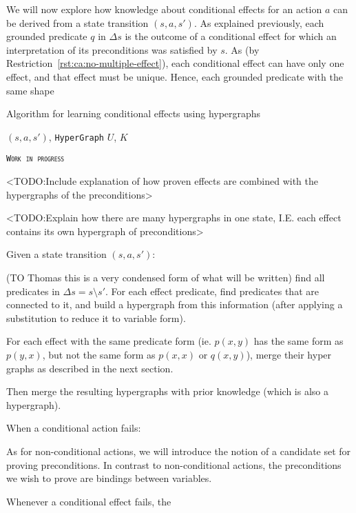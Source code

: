 \documentclass[../Master.tex]{subfiles}
\begin{document}
We will now explore how knowledge about conditional effects for an action $a$ can be derived from a  state transition $\left( s, a ,s' \right)$. As explained previously, each grounded predicate $q$ in $\Delta s$ is the outcome of a conditional effect for which an interpretation of its preconditions was satisfied by $s$. As (by Restriction~\ref{rst:ca:no-multiple-effect}), each conditional effect can have only one effect, and that effect must be unique. Hence, each grounded predicate with the same shape


\begin{algorithm}
    \caption{Algorithm for learning conditional effects using hypergraphs}\label{algo:CondEffLearn}
    \begin{algorithmic}
         {$\left( s, a, s'\right)$, \texttt{HyperGraph} $U$, $K$}
        \EndFunction%
    \end{algorithmic}
\end{algorithm}

\textsc{\texttt{Work in progress}}

<TODO:\@ Include explanation of how proven effects are combined with the hypergraphs of the preconditions>

<TODO:\@ Explain how there are many hypergraphs in one state, I.E. each effect contains its own hypergraph of preconditions>

Given a state transition $(s,a,s')$:

(TO Thomas this is a very condensed form of what will be written)
find all predicates in $\Delta s = s \setminus s'$. For each effect predicate, find predicates that are connected to it, and build a hypergraph from this information (after applying a substitution to reduce it to variable form). 

For each effect with the same predicate form (ie. $p(x,y)$ has the same form as $p(y,x)$, but not the same form as $p(x,x)$ or $q(x,y)$), merge their hyper graphs as described in the next section. 

Then merge the resulting hypergraphs with prior knowledge (which is also a hypergraph).

When a conditional action fails:

As for non-conditional actions, we will introduce the notion of a candidate set for proving preconditions. In contrast to non-conditional actions, the preconditions we wish to prove are bindings between variables. 

Whenever a conditional effect fails, the 
\end{document}
